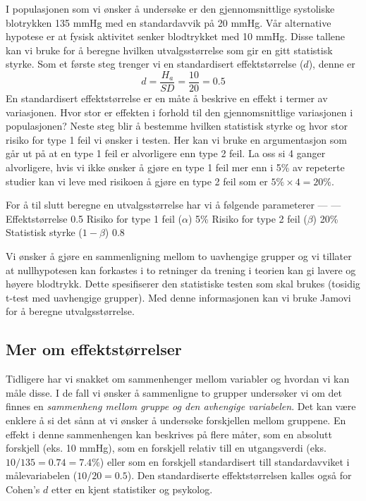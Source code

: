 \documentclass[
  letterpaper,
  DIV=11,
  numbers=noendperiod,
  oneside]{scrreprt}
\begin{document}
I populasjonen som vi ønsker å undersøke er den gjennomsnittlige
systoliske blotrykken 135 mmHg med en standardavvik på 20 mmHg. Vår
alternative hypotese er at fysisk aktivitet senker blodtrykket med 10
mmHg. Disse tallene kan vi bruke for å beregne hvilken utvalgsstørrelse
som gir en gitt statistisk styrke. Som et første steg trenger vi en
standardisert effektstørrelse (\(d\)), denne er
\[d = \frac{H_a}{SD} = \frac{10}{20} = 0.5\] En standardisert
effektstørrelse er en måte å beskrive en effekt i termer av variasjonen.
Hvor stor er effekten i forhold til den gjennomsnittlige variasjonen i
populasjonen? Neste steg blir å bestemme hvilken statistisk styrke og
hvor stor risiko for type 1 feil vi ønsker i testen. Her kan vi bruke en
argumentasjon som går ut på at en type 1 feil er alvorligere enn type 2
feil. La oss si 4 ganger alvorligere, hvis vi ikke ønsker å gjøre en
type 1 feil mer enn i 5\% av repeterte studier kan vi leve med risikoen
å gjøre en type 2 feil som er \(5\% \times 4 = 20\%\).

For å til slutt beregne en utvalgsstørrelse har vi å følgende
parameterer \textbar{} \textbar{} \textbar{} \textbar--- \textbar{}
---\textbar{} \textbar Effektstørrelse \textbar{} 0.5\textbar{}
\textbar Risiko for type 1 feil (\(\alpha\))\textbar{} 5\%\textbar{}
\textbar Risiko for type 2 feil (\(\beta\))\textbar{} 20\%\textbar{}
\textbar Statistisk styrke (\(1-\beta\))\textbar{} 0.8\textbar{}

Vi ønsker å gjøre en sammenligning mellom to uavhengige grupper og vi
tillater at nullhypotesen kan forkastes i to retninger da trening i
teorien kan gi lavere og høyere blodtrykk. Dette spesifiserer den
statistiske testen som skal brukes (tosidig t-test med uavhengige
grupper). Med denne informasjonen kan vi bruke Jamovi for å beregne
utvalgsstørrelse.

\hypertarget{mer-om-effektstuxf8rrelser}{%
\subsection{Mer om effektstørrelser}\label{mer-om-effektstuxf8rrelser}}

Tidligere har vi snakket om sammenhenger mellom variabler og hvordan vi
kan måle disse. I de fall vi ønsker å sammenligne to grupper undersøker
vi om det finnes en \emph{sammenheng mellom gruppe og den avhengige
variabelen}. Det kan være enklere å si det sånn at vi ønsker å undersøke
forskjellen mellom gruppene. En effekt i denne sammenhengen kan
beskrives på flere måter, som en absolutt forskjell (eks. 10 mmHg), som
en forskjell relativ till en utgangsverdi (eks.
\(10/135 = 0.74 = 7.4\%\)) eller som en forskjell standardisert till
standardavviket i målevariabelen (\(10/20 = 0.5\)). Den standardiserte
effektstørrelsen kalles også for Cohen's \(d\) etter en kjent
statistiker og psykolog.
\end{document}
